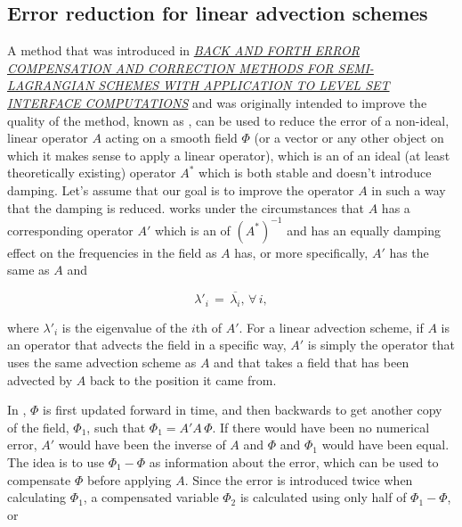 \subsection{Error reduction for linear advection schemes}

A method that was introduced in \textit{\href{http://www.google.se/url?sa=t&rct=j&q=&esrc=s&source=web&cd=1&cad=rja&ved=0CC0QFjAA&url=http\%3A\%2F\%2Fciteseerx.ist.psu.edu\%2Fviewdoc\%2Fdownload\%3Fdoi\%3D10.1.1.115.7663\%26rep\%3Drep1\%26type\%3Dpdf&ei=XHnwUOjlJoOK4ATAg4GgAg&usg=AFQjCNE4DIndzRfCNysW63F-FevKcuXxUA&bvm=bv.1357700187,d.bGE}{BACK AND FORTH ERROR COMPENSATION AND CORRECTION METHODS FOR SEMI-LAGRANGIAN SCHEMES WITH APPLICATION TO LEVEL SET INTERFACE COMPUTATIONS}} \citep{temp} and was originally intended to improve the quality of the \LS method, known as \BFECC, can be used to reduce the error of a non-ideal, linear operator $A$ acting on a smooth field $\Phi$ (or a vector or any other object on which it makes sense to apply a linear operator), which is an \approximation of an ideal (at least theoretically existing) operator $A^*$ which is both stable and doesn't introduce damping. Let's assume that our goal is to improve the operator $A$ in such a way that the damping is reduced. \BFECC works under the circumstances that $A$ has a corresponding operator $A'$ which is an \approximation of $(A^*)^{-1}$ and has an equally damping effect on the frequencies in the field as $A$ has, or more specifically, $A'$ has the same \eigenfunctions as $A$ and

\begin{equation}
\lambda'_i \,=\, \overline{\lambda_i}, \,\forall\,i,
\end{equation}

where $\lambda'_i$ is the eigenvalue of the $i$th \eigenfunction of $A'$. For a linear advection scheme, if $A$ is an operator that advects the field in a specific way, $A'$ is simply the operator that uses the same advection scheme as $A$ and that takes a field that has been advected by $A$ back to the position it came from.

In \BFECC, $\Phi$ is first updated forward in time, and then backwards to get another copy of the field, $\Phi_1$, such that $\Phi_1 = A'A\,\Phi$. If there would have been no numerical error, $A'$ would have been the inverse of $A$ and $\Phi$ and $\Phi_1$ would have been equal. The idea is to use $\Phi_1-\Phi$ as information about the error, which can be used to compensate $\Phi$ before applying $A$. Since the error is introduced twice when calculating $\Phi_1$, a compensated variable $\Phi_2$ is calculated using only half of $\Phi_1-\Phi$, or

